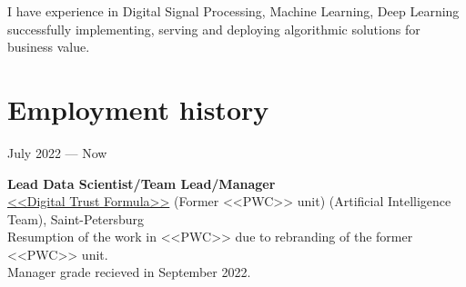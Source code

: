 \documentclass[10pt,a4paper]{article}
\newcommand{\lmpratio}{0.15}
\newcommand{\rmpratio}{0.74}
\newcommand{\verticalSpace}{0.3cm}
\newcommand{\vSpace}{0.5cm}
\newcommand{\horizontalSpace}{0.05\textwidth}
\newcommand{\sectionMain}[1]{\textbf{#1}}
\begin{document}
	
	I have experience in Digital Signal Processing, Machine Learning, Deep Learning successfully implementing, serving and deploying algorithmic solutions for business value.
	
	
	
	
	\setlength{\parindent}{0em}
	\vspace{\verticalSpace}
	\vspace{\verticalSpace}
	\section*{Employment history}

	\begin{minipage}[t]{\lmpratio\textwidth}
		July 2022 --- Now
	\end{minipage}
	\hspace{\horizontalSpace}
	\begin{minipage}[t]{\rmpratio\textwidth}
		\sectionMain{Lead Data Scientist/Team Lead/Manager}\\
		\href{https://www.tedo.ru/}{<<Digital Trust Formula>>} (Former <<PWC>> unit) (Artificial Intelligence Team), Saint-Petersburg\\[0.3cm]		
		
		Resumption of the work in <<PWC>> due to rebranding of the former <<PWC>> unit.\\
		Manager grade recieved in September 2022.
			
	\end{minipage}	
	\vspace{\vSpace}
\end{document}
